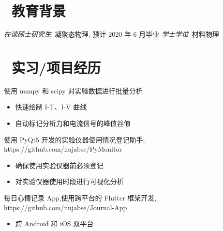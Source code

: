 \documentclass{resume}
\begin{document}


 
\section{\faGraduationCap\  教育背景}
\textit{在读硕士研究生}\ 凝聚态物理, 预计 2020 年 6 月毕业
\textit{学士学位}\ 材料物理

\section{\faUsers\ 实习/项目经历}

\begin{onehalfspacing}
  使用 numpy 和 scipy 对实验数据进行批量分析 
  \begin{itemize}
    \item 快速绘制 I-T、I-V 曲线
    \item 自动标记分析力和电流信号的峰值谷值
  \end{itemize}
\end{onehalfspacing}

\begin{onehalfspacing}
使用 PyQt5 开发的实验仪器使用情况登记助手, https://github.com/nujabse/PyMonitor
\begin{itemize}
  \item 确保使用实验仪器前必须登记
  \item 对实验仪器使用时段进行可视化分析
\end{itemize}
\end{onehalfspacing}

\begin{onehalfspacing}
每日心情记录 App,使用跨平台的 Flutter 框架开发, https://github.com/nujabse/Journal-App
\begin{itemize}
  \item 跨 Android 和 iOS 双平台
\end{itemize}
\end{onehalfspacing}
\end{document}
